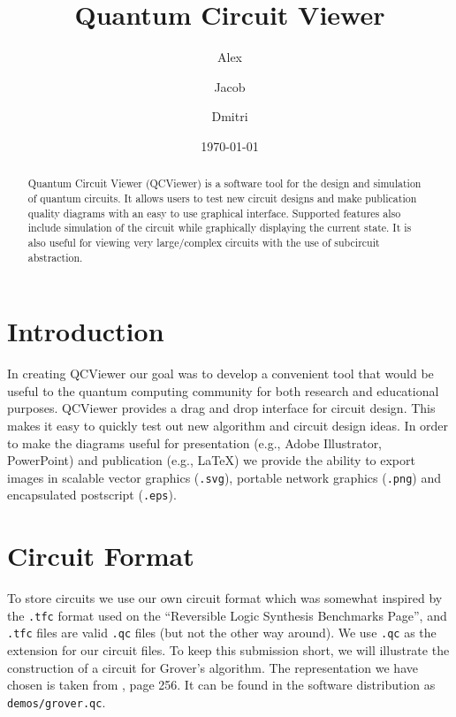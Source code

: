 \documentclass[aps,prl,reprint,floatfix,superscriptaddress]{revtex4-1} %
\begin{document}

\title{Quantum Circuit Viewer}
\date{\today}
\author{Alex }
\author{Jacob }
\author{Dmitri }
\begin{abstract}
Quantum Circuit Viewer (QCViewer) is a software tool for the design and simulation of 
quantum circuits.  It allows users to test new circuit designs and make publication 
quality diagrams with an easy to use graphical interface.  Supported features also include
simulation of the circuit while graphically displaying the current state.  It is also useful 
for viewing very large/complex circuits with the use of subcircuit abstraction.
\end{abstract}
\maketitle

\section{Introduction}
In creating QCViewer our goal was to develop a convenient tool that would be useful to
the quantum computing community for both research and educational purposes. QCViewer 
provides a drag and drop interface for circuit design.  This makes it easy to quickly
test out new algorithm and circuit design ideas.  In order to make the diagrams useful for presentation 
(e.g., Adobe Illustrator, PowerPoint) and publication (e.g., \LaTeX) we provide the ability to export images in scalable
vector graphics (\verb+.svg+), portable network graphics (\verb+.png+) and encapsulated postscript (\verb+.eps+).
\section{Circuit Format}
To store circuits we use our own circuit format which was somewhat 
inspired by the \verb+.tfc+ format used on the ``Reversible Logic Synthesis Benchmarks Page''\cite{maslovBench}, and \verb+.tfc+ files are valid \verb+.qc+ files (but not the other way around).
We use \verb+.qc+ as the extension for our circuit files.
To keep this submission short, we will illustrate the construction of a circuit for Grover's algorithm.  The representation we have chosen is 
taken from \cite{nielsen2000quantum}, page 256. It can be found in the software distribution as \verb+demos/grover.qc+.
\end{document}
